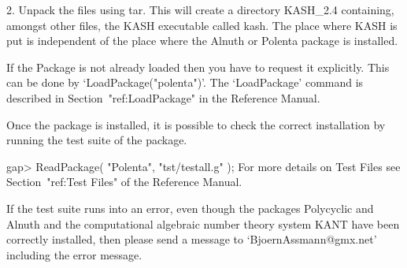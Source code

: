 \item{2.} Unpack the files using tar.  This will create a directory
    KASH_2.4 containing, amongst other files, the KASH executable called
    kash.  The place where KASH is put is independent of the place
    where the Alnuth or Polenta package is installed.
    
\endlist
                                                                               


\null

If the {\Polenta} Package is not already loaded 
then you have to request it explicitly. 
This  can be 
done by `LoadPackage("polenta")'.
The `LoadPackage' command is described in Section~"ref:LoadPackage"
in the {\GAP} Reference Manual.


    Once the package is installed, it is possible to check the correct
    installation by running the test suite of the package.

\beginexample
    gap> ReadPackage( "Polenta", "tst/testall.g" );
\endexample
    For more details on  Test Files see 
    Section~"ref:Test Files" of the 
    {\GAP} Reference Manual.

    If the test suite runs into an error, even though the packages
    Polycyclic and 
    Alnuth  and  the computational algebraic number theory system KANT
    have been correctly installed, then please send a message
    to `BjoernAssmann@gmx.net' including the error message.



